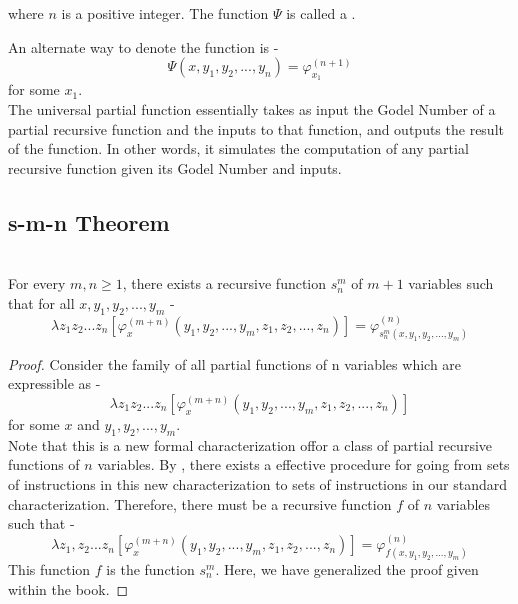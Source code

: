 \documentclass[openany]{book}
\begin{document}
where $n$ is a positive integer. The function $\Psi$ is called a .  
\begin{mynote}
An alternate way to denote the function is - \\
$$\Psi(x, y_1, y_2, ..., y_n) = \varphi^{(n+1)}_{x_1}$$ for some $x_1$. \\
The universal partial function essentially takes as input the Godel Number of a partial recursive function and the inputs to that function, and outputs the result of the function. In other words, it simulates the computation of any partial recursive function given its Godel Number and inputs.
\end{mynote}
\subsection{s-m-n Theorem}
\begin{mytheorem}[s-m-n Theorem]
 \\
For every $m, n \geq 1$, there exists a recursive function $s_n^m$ of $m+1$ variables such that for all  $x, y_1, y_2, ..., y_m$ -
$$\lambda z_{1}z_{2}...z_{n}[\varphi_{x}^{(m+n)}(y_1, y_2, ..., y_m, z_1, z_2, ..., z_n)] = \varphi^{(n)}_{s^{m}_{n}(x, y_1, y_2, ..., y_m)}$$
\end{mytheorem}
\begin{proof}
    Consider the family of all partial functions of n variables which are expressible as -  $$\lambda z_{1}z_{2}...z_{n}[\varphi_{x}^{(m+n)}(y_1, y_2, ..., y_m, z_1, z_2, ..., z_n)]$$ for some $x$ and $y_1, y_2, ..., y_m$. \\
    Note that this is a new formal characterization offor a class of partial recursive functions of $n$ variables. By , there exists a effective procedure for going from sets of instructions in this new characterization to sets of instructions in our standard characterization. Therefore, there must be a recursive function $f$ of $n$ variables such that - 
    $$\lambda z_1, z_2... z_n[\varphi_{x}^{(m+n)}(y_1, y_2, ..., y_m, z_1, z_2, ..., z_n)] = \varphi^{(n)}_{f(x, y_1, y_2, ..., y_m)}$$
    This function $f$ is the function $s_n^m$. Here, we have generalized the proof given within the book.
\end{proof}
\end{document}
